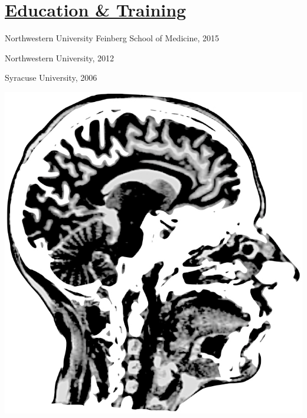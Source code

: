 \documentclass[]{winter-resume-openfont}
\begin{document}
\begin{minipage}[t]{0.3\textwidth}
\section{\underline{Education \& Training}}
\sectionsep
{} 
\begin{tightemize}
\sectionsep
\sectionsep
\item[] Northwestern University Feinberg School of Medicine, 2015
\end{tightemize}

\begin{tightemize}
\item[] Northwestern University, 2012
\end{tightemize}

\begin{tightemize}

\item[] Syracuse University, 2006
\end{tightemize}
\sectionsep


\begin{center}
\includegraphics[scale=0.1]{brain}

\end{center}
\end{minipage} 
\end{document}
